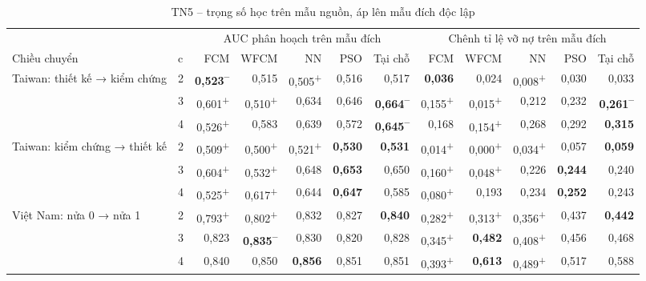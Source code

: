 \begin{table}[htbp]
\centering
\caption{TN5 -- trọng số học trên mẫu nguồn, áp lên mẫu đích độc lập}
\label{tab:e10-ket-qua}
\footnotesize
\setlength{\tabcolsep}{2pt}
\begin{tabular}{@{}llrrrrrrrrrr@{}}
\toprule
& & \multicolumn{5}{c}{AUC phân hoạch trên mẫu đích} & \multicolumn{5}{c}{Chênh tỉ lệ vỡ nợ trên mẫu đích} \\
\cmidrule(lr){3-7} \cmidrule(lr){8-12}
Chiều chuyển & c & FCM & WFCM & NN & PSO & Tại chỗ & FCM & WFCM & NN & PSO & Tại chỗ \\
\midrule
Taiwan: thiết kế → kiểm chứng & 2 & \textbf{0,523\textsuperscript{--}} & 0,515 & 0,505\textsuperscript{+} & 0,516 & 0,517 & \textbf{0,036} & 0,024 & 0,008\textsuperscript{+} & 0,030 & 0,033 \\
 & 3 & 0,601\textsuperscript{+} & 0,510\textsuperscript{+} & 0,634 & 0,646 & \textbf{0,664\textsuperscript{--}} & 0,155\textsuperscript{+} & 0,015\textsuperscript{+} & 0,212 & 0,232 & \textbf{0,261\textsuperscript{--}} \\
 & 4 & 0,526\textsuperscript{+} & 0,583 & 0,639 & 0,572 & \textbf{0,645\textsuperscript{--}} & 0,168 & 0,154\textsuperscript{+} & 0,268 & 0,292 & \textbf{0,315} \\
\midrule
Taiwan: kiểm chứng → thiết kế & 2 & 0,509\textsuperscript{+} & 0,500\textsuperscript{+} & 0,521\textsuperscript{+} & \textbf{0,530} & \textbf{0,531} & 0,014\textsuperscript{+} & 0,000\textsuperscript{+} & 0,034\textsuperscript{+} & 0,057 & \textbf{0,059} \\
 & 3 & 0,604\textsuperscript{+} & 0,532\textsuperscript{+} & 0,648 & \textbf{0,653} & 0,650 & 0,160\textsuperscript{+} & 0,048\textsuperscript{+} & 0,226 & \textbf{0,244} & 0,240 \\
 & 4 & 0,525\textsuperscript{+} & 0,617\textsuperscript{+} & 0,644 & \textbf{0,647} & 0,585 & 0,080\textsuperscript{+} & 0,193 & 0,234 & \textbf{0,252} & 0,243 \\
\midrule
Việt Nam: nửa 0 → nửa 1 & 2 & 0,793\textsuperscript{+} & 0,802\textsuperscript{+} & 0,832 & 0,827 & \textbf{0,840} & 0,282\textsuperscript{+} & 0,313\textsuperscript{+} & 0,356\textsuperscript{+} & 0,437 & \textbf{0,442} \\
 & 3 & 0,823 & \textbf{0,835\textsuperscript{--}} & 0,830 & 0,820 & 0,828 & 0,345\textsuperscript{+} & \textbf{0,482} & 0,408\textsuperscript{+} & 0,456 & 0,468 \\
 & 4 & 0,840 & 0,850 & \textbf{0,856} & 0,851 & 0,851 & 0,393\textsuperscript{+} & \textbf{0,613} & 0,489\textsuperscript{+} & 0,517 & 0,588 \\

\end{tabular}
\end{table}
